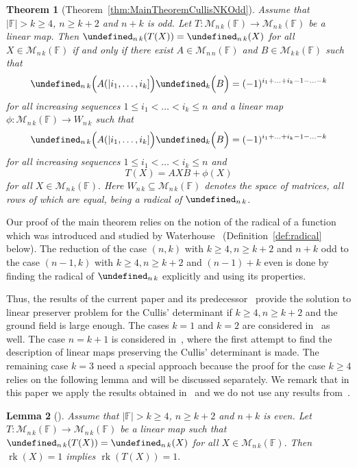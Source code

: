 \documentclass{elsarticle}
\DeclareMathOperator{\rk}{rk}
\def\F{{\mathbb F}}
\def\M{{\mathcal M}}
\let\det\undefined
\DeclareMathOperator{\det}{det}
\theoremstyle{plain}
\newtheorem{theorem}{Theorem}[section]
\newtheorem{lemma}[theorem]{Lemma}
\theoremstyle{definition}
\numberwithin{equation}{section}
\begin{document}
\begin{theorem}[Theorem~\ref{thm:MainTheoremCullisNKOdd}]Assume that $|\F| > k \ge 4$, $n \ge k + 2$ and $n + k$ is odd. Let $T\colon \M_{n\,k} (\F) \to \M_{n\,k} (\F)$ be a linear map. Then $\det_{n\, k} (T(X)) = \det_{n\,k}(X)$ for all $X \in \M_{n\,k} (\F)$ if and only if  there exist $A \in \M_{n\, n}(\F)$ and $B \in \M_{k\, k}(\F)$ such that
\[
\det_{n\,k} \Bigl(A(|i_1,\ldots, i_k]\Bigr) \det_k \Bigl(B\Bigr) = (-1)^{i_1 + \ldots + i_k - 1 - \ldots - k}
\]
for all increasing sequences $1 \le i_1 < \ldots < i_k \le n $ and a linear map\linebreak $\phi\colon \M_{n\,k}(\F) \to W_{n\,k}$ such that
\[
\det_{n\,k} \Bigl(A(|i_1,\ldots, i_k]\Bigr) \det_k \Bigl(B\Bigr) = (-1)^{i_1 + \ldots + i_k - 1 - \ldots - k}
\]
for all increasing sequences $1 \le i_1 < \ldots < i_k \le n $ and
\begin{equation*}
T(X) = AXB + \phi(X)
\end{equation*}
for all $X \in \M_{n\,k} (\F).$ Here $W_{n\,k} \subseteq \M_{n\,k}(\F)$ denotes the space of matrices, all rows of which are equal, being a radical of $\det_{n\,k}$.
\end{theorem}


Our proof of the main theorem relies on the notion of the radical of a function which was introduced and studied by Waterhouse~\cite{Waterhouse1983} (Definition~\ref{def:radical} below). The reduction of the case $(n,k)$ with $k \ge 4, n \ge k + 2$ and $n + k$ odd to the case $(n-1,k)$ with $k \ge 4, n \ge k + 2$ and $(n-1) + k$ even is done by finding the radical of $\det_{n\,k}$ explicitly and using its properties.

Thus, the results of the current paper and its predecessor~\cite{Guterman2025} provide the solution to linear preserver problem for the Cullis' determinant if $k \ge 4, n \ge k + 2$ and the ground field is large enough. The cases $k = 1$ and $k = 2$ are considered in~\cite{Guterman2025} as well. The case $n = k + 1$ is considered in~\cite{Guterman2024}, where the first attempt to find the description of linear maps preserving the Cullis' determinant is made. The remaining case $k = 3$ need a special approach because the proof for the case $k \ge 4$ relies on the following lemma and will be discussed separately. We remark that in this paper we apply the results obtained in~\cite{Guterman2025} and we do not use any results from~\cite{Guterman2024}.

\begin{lemma}[{\cite[Lemma~5.13]{Guterman2025}}]\label{lem:CullisDeg1Rank1}Assume that $|\F| > k \ge 4$, $n \ge k + 2$ and $n + k$ is even. Let  $T\colon \M_{n\, k} (\F) \to \M_{n\, k} (\F)$ be a linear map such that  $\det_{n\, k} (T(X)) = \det_{n\,k}(X)$ for all $X \in \M_{n\, k} (\F).$ Then $\rk (X) = 1$ implies $\rk (T(X)) = 1.$
\end{lemma}
\end{document}
